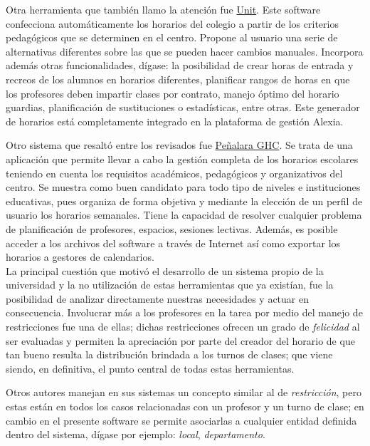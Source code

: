 Otra herramienta que también llamo la atención fue \href{http://www.educaria.es/#horarios2}{Unit}\cite{Unit}. Este software confecciona automáticamente los horarios del colegio a partir de los criterios pedagógicos que se determinen en el centro. Propone al usuario una serie de alternativas diferentes sobre las que se pueden hacer cambios manuales. Incorpora además otras funcionalidades, dígase: la posibilidad de crear horas de entrada y recreos de los alumnos en horarios diferentes, planificar rangos de horas en que los profesores deben impartir clases por contrato, manejo óptimo del horario guardias, planificación de sustituciones o estadísticas, entre otras. Este generador de horarios está completamente integrado en la plataforma de gestión Alexia.\cite{Alexia}

Otro sistema que resaltó entre los revisados fue \href{https://www.penalara.com/es/CU}{Peñalara GHC}\cite{Penalara_GHC}. Se trata de una aplicación que permite llevar a cabo la gestión completa de los horarios escolares teniendo en cuenta los requisitos académicos, pedagógicos y organizativos del centro. Se muestra como buen candidato para todo tipo de niveles e instituciones educativas, pues organiza de forma objetiva y mediante la elección de un perfil de usuario los horarios semanales. Tiene la capacidad de resolver cualquier problema de planificación de profesores, espacios, sesiones lectivas. Además, es posible acceder a los archivos del software a través de Internet así como exportar los horarios a gestores de calendarios.\\

La principal cuestión que motivó el desarrollo de un sistema propio de la universidad y la no utilización de estas herramientas que ya existían, fue la posibilidad de analizar directamente nuestras necesidades y actuar en consecuencia. Involucrar más a los profesores en la tarea por medio del manejo de restricciones fue una de ellas; dichas restricciones ofrecen un grado de \emph{felicidad} al ser evaluadas y permiten la apreciación por parte del creador del horario de que tan bueno resulta la distribución brindada a los turnos de clases; que viene siendo, en definitiva, el punto central de todas estas herramientas. 

Otros autores manejan en sus sistemas un concepto similar al de \emph{restricción}, pero estas están en todos los casos relacionadas con un profesor y un turno de clase; en cambio en el presente software se permite asociarlas a cualquier entidad definida dentro del sistema, dígase por ejemplo: \emph{local}, \emph{departamento}.


